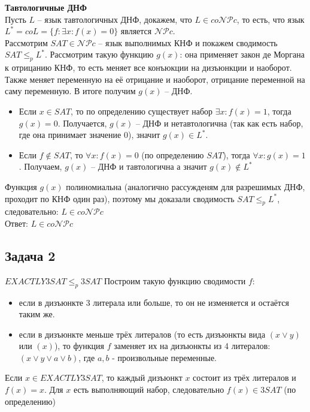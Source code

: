\documentclass[a4paper,12pt]{article} %
\begin{document}
{\bf Тавтологичные ДНФ} \\
Пусть $ L $ -- язык тавтологичных ДНФ, докажем, что $ L \in co\mathcal{NP}c $, то есть, что язык $ L^* = coL = \{ f: \exists x : f(x) = 0\}$ является $\mathcal{NP}c$.\\
Рассмотрим $ SAT \in \mathcal{NP}c$ -- язык выполнимых КНФ и покажем сводимость $ SAT \leqslant_p L^* $. Рассмотрим такую функцию $ g(x) $: она применяет закон де Моргана к отрицанию КНФ, то есть меняет все конъюкции на дизъюнкции и наоборот. Также меняет переменную на её отрицание и наоборот, отрицание переменной на саму переменную. В итоге получим $ g(x) $ -- ДНФ.\\
\begin{itemize}
\item Если $ x \in SAT $, то по определению существует набор $\exists x: f(x)=1$, тогда $g(x) = 0$. Получается, $ g(x)$ -- ДНФ и нетавтологична (так как есть набор, где она принимает значение 0), значит $g(x) \in L^*$.
\item Если $f \notin SAT$, то $\forall x : f(x) = 0$ (по определению $ SAT $), тогда $\forall x : g(x) = 1$. Получаем, $ g(x) $ -- ДНФ и тавтологична а значит $ g(x) \notin L^* $
\end{itemize} 
Функция $ g(x) $ полиномиальна (аналогично рассужденям для разрешимых ДНФ, проходит по КНФ один раз), поэтому мы доказали сводимость $ SAT \leqslant_p L^* $, следовательно: $ L \in co\mathcal{NP}c $\\
Ответ: $ L \in co\mathcal{NP}c $\\

\subsection*{Задача 2}
{\bf $EXACTLY3SAT \leq_p 3SAT$}
Построим такую функцию сводимости $ f $:
\begin{itemize}
\item если в дизъюнкте 3 литерала или больше, то он не изменяется и остаётся таким же.
\item если в дизъюнкте меньше трёх литералов (то есть дизъюнкты вида $ (x \vee y) $ или $ (x) $), то функция $ f $ заменяет их на дизъюнкты из 4 литералов: $ (x \vee y \vee a \vee b) $, где $ a,b $ - произвольные переменные.
\end{itemize}

Если $ x \in EXACTLY3SAT $, то каждый дизъюнкт $ x $ состоит из трёх литералов и $ f(x)=x $. Для $ x $ есть выполняющий набор, следовательно $f(x) \in 3SAT$ (по определению)\\
\end{document}
